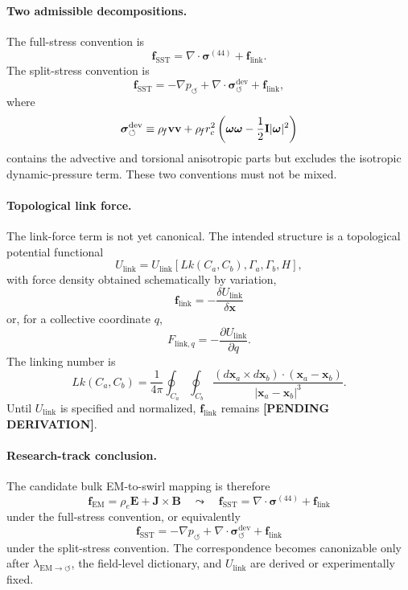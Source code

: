 \paragraph{Two admissible decompositions.}
The full-stress convention is
\[
\boxed{
\mathbf f_{\mathrm{SST}}
=
\nabla\cdot\boldsymbol{\sigma}^{(44)}
+
\mathbf f_{\mathrm{link}} .
}
\]
The split-stress convention is
\[
\boxed{
\mathbf f_{\mathrm{SST}}
=
-\nabla p_{\circlearrowleft}
+
\nabla\cdot\boldsymbol{\sigma}^{\mathrm{dev}}_{\circlearrowleft}
+
\mathbf f_{\mathrm{link}},
}
\]
where
\[
\boldsymbol{\sigma}^{\mathrm{dev}}_{\circlearrowleft}
\equiv
\rho_{\!f}\mathbf v\mathbf v
+
\rho_{\!f}r_c^2
\left(
\boldsymbol{\omega}\boldsymbol{\omega}
-
\frac12\mathbf I|\boldsymbol{\omega}|^2
\right)
\]
contains the advective and torsional anisotropic parts but excludes the
isotropic dynamic-pressure term.  These two conventions must not be mixed.

\paragraph{Topological link force.}
The link-force term is not yet canonical.  The intended structure is a
topological potential functional
\[
U_{\mathrm{link}}
=
U_{\mathrm{link}}\!\left[
Lk(C_a,C_b),\Gamma_a,\Gamma_b,H
\right],
\]
with force density obtained schematically by variation,
\[
\boxed{
\mathbf f_{\mathrm{link}}
=
-\frac{\delta U_{\mathrm{link}}}{\delta \mathbf x}
}
\]
or, for a collective coordinate \(q\),
\[
\boxed{
F_{\mathrm{link},q}
=
-\frac{\partial U_{\mathrm{link}}}{\partial q}.
}
\]
The linking number is
\[
Lk(C_a,C_b)
=
\frac{1}{4\pi}
\oint_{C_a}\oint_{C_b}
\frac{
(d\mathbf x_a\times d\mathbf x_b)\cdot(\mathbf x_a-\mathbf x_b)
}{
|\mathbf x_a-\mathbf x_b|^3
}.
\]
Until \(U_{\mathrm{link}}\) is specified and normalized,
\(\mathbf f_{\mathrm{link}}\) remains
\textbf{[PENDING DERIVATION]}.

\paragraph{Research-track conclusion.}
The candidate bulk EM-to-swirl mapping is therefore
\[
\boxed{
\mathbf f_{\mathrm{EM}}
=
\rho_e\mathbf E+\mathbf J\times\mathbf B
\quad\leadsto\quad
\mathbf f_{\mathrm{SST}}
=
\nabla\cdot\boldsymbol{\sigma}^{(44)}
+
\mathbf f_{\mathrm{link}}
}
\]
under the full-stress convention, or equivalently
\[
\boxed{
\mathbf f_{\mathrm{SST}}
=
-\nabla p_{\circlearrowleft}
+
\nabla\cdot\boldsymbol{\sigma}^{\mathrm{dev}}_{\circlearrowleft}
+
\mathbf f_{\mathrm{link}}
}
\]
under the split-stress convention.  The correspondence becomes canonizable
only after
\(\lambda_{\mathrm{EM}\to\circlearrowleft}\),
the field-level dictionary, and
\(U_{\mathrm{link}}\)
are derived or experimentally fixed.



